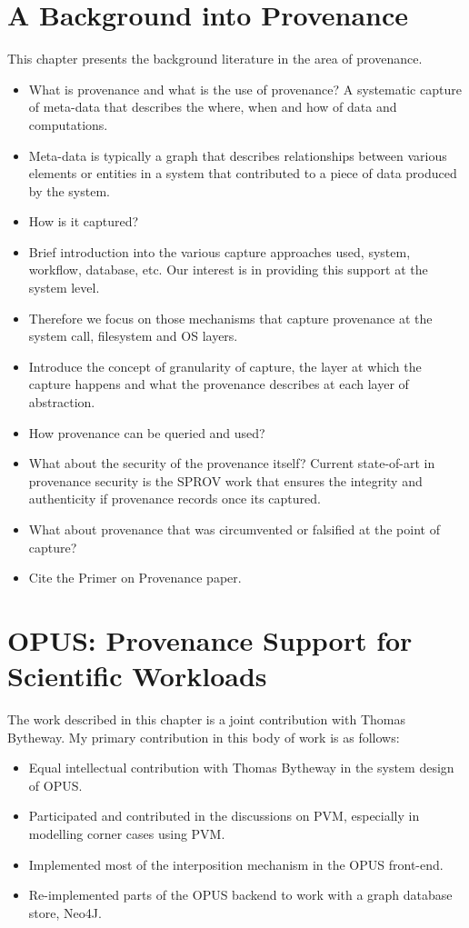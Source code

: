 \documentclass[withindex,glossary]{cam-thesis}
\begin{document}
\chapter{A Background into Provenance}
This chapter presents the background literature in the area of provenance.
\begin{itemize}
\item What is provenance and what is the use of provenance? A systematic capture of meta-data that describes the where, when and how of data and computations.
\item Meta-data is typically a graph that describes relationships between various elements or entities in a system that contributed to a piece of data produced by the system.
\item How is it captured?
\item Brief introduction into the various capture approaches used, system, workflow, database, etc. Our interest is in providing this support at the system level.
\item Therefore we focus on those mechanisms that capture provenance at the system call, filesystem and OS layers.
\item Introduce the concept of granularity of capture, the layer at which the capture happens and what the provenance describes at each layer of abstraction.
\item How provenance can be queried and used?
\item What about the security of the provenance itself? Current state-of-art in provenance security is the SPROV work that ensures the integrity and authenticity if provenance records once its captured.
\item What about provenance that was circumvented or falsified at the point of capture?
\item Cite the Primer on Provenance paper.
\end{itemize}

\chapter{OPUS: Provenance Support for Scientific Workloads}
The work described in this chapter is a joint contribution with Thomas Bytheway. My primary contribution in this body of work is as follows:

\begin{itemize}
\item Equal intellectual contribution with Thomas Bytheway in the system design of OPUS.
\item Participated and contributed in the discussions on PVM, especially in modelling corner cases using PVM.
\item Implemented most of the interposition mechanism in the OPUS front-end.
\item Re-implemented parts of the OPUS backend to work with a graph database store, Neo4J.
\end{itemize}
\end{document}
